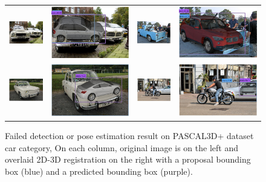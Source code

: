 \documentclass[10pt,twocolumn,letterpaper]{article}
\begin{document}
\begin{figure}[h]
\begin{tabular}{|cc|cc|}
  \includegraphics[width=0.22\linewidth]{supp/pas_car14a.png} &
  \includegraphics[width=0.22\linewidth]{supp/pas_car14b.png} & 
  \includegraphics[width=0.22\linewidth]{supp/pas_car15a.png} &
  \includegraphics[width=0.22\linewidth]{supp/pas_car15.png} \\ 
  \includegraphics[width=0.22\linewidth]{supp/pas_car20a.png} &
  \includegraphics[width=0.22\linewidth]{supp/pas_car20b.png} &
  \includegraphics[width=0.22\linewidth]{supp/pas_car23a.png} &
  \includegraphics[width=0.22\linewidth]{supp/pas_car23b.png} \\
  \hline
  \end{tabular}
\caption{Failed detection or pose estimation result on PASCAL3D+ dataset
  car category, On each column, original image is on the left and overlaid
  2D-3D registration on the right with a proposal bounding box (blue) and a
  predicted bounding box (purple).} 
  \label{fig:pascal3d_car_bad}
\end{figure}
\end{document}
